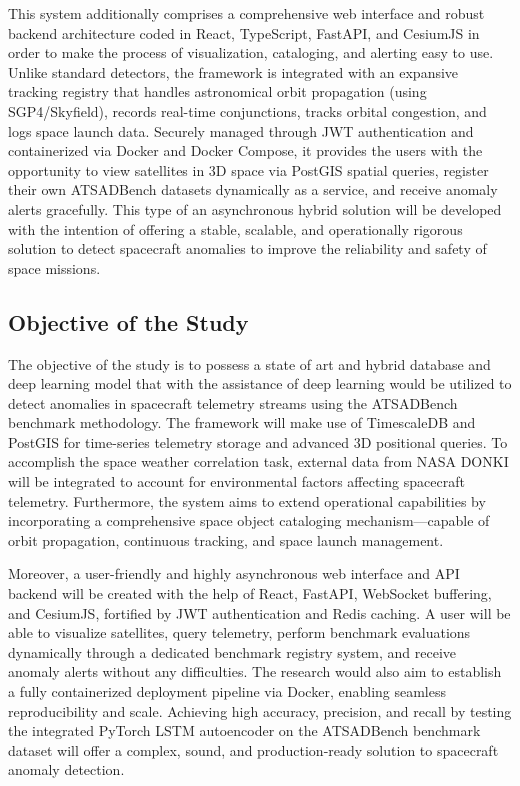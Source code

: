 \documentclass[conference]{IEEEtran}
\begin{document}
This system additionally comprises a comprehensive web interface and robust backend architecture coded in React, TypeScript, FastAPI, and CesiumJS in order to make the process of visualization, cataloging, and alerting easy to use. Unlike standard detectors, the framework is integrated with an expansive tracking registry that handles astronomical orbit propagation (using SGP4/Skyfield), records real-time conjunctions, tracks orbital congestion, and logs space launch data. Securely managed through JWT authentication and containerized via Docker and Docker Compose, it provides the users with the opportunity to view satellites in 3D space via PostGIS spatial queries, register their own ATSADBench datasets dynamically as a service, and receive anomaly alerts gracefully. This type of an asynchronous hybrid solution will be developed with the intention of offering a stable, scalable, and operationally rigorous solution to detect spacecraft anomalies to improve the reliability and safety of space missions.

\subsection{Objective of the Study}

The objective of the study is to possess a state of art and hybrid database and deep learning model that with the assistance of deep learning would be utilized to detect anomalies in spacecraft telemetry streams using the ATSADBench benchmark methodology. The framework will make use of TimescaleDB and PostGIS for time-series telemetry storage and advanced 3D positional queries. To accomplish the space weather correlation task, external data from NASA DONKI will be integrated to account for environmental factors affecting spacecraft telemetry. Furthermore, the system aims to extend operational capabilities by incorporating a comprehensive space object cataloging mechanism—capable of orbit propagation, continuous tracking, and space launch management.

Moreover, a user-friendly and highly asynchronous web interface and API backend will be created with the help of React, FastAPI, WebSocket buffering, and CesiumJS, fortified by JWT authentication and Redis caching. A user will be able to visualize satellites, query telemetry, perform benchmark evaluations dynamically through a dedicated benchmark registry system, and receive anomaly alerts without any difficulties. The research would also aim to establish a fully containerized deployment pipeline via Docker, enabling seamless reproducibility and scale. Achieving high accuracy, precision, and recall by testing the integrated PyTorch LSTM autoencoder on the ATSADBench benchmark dataset will offer a complex, sound, and production-ready solution to spacecraft anomaly detection.
\end{document}
